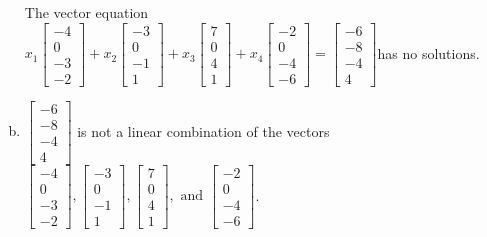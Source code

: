 \begin{exerciseAnswer}
\begin{enumerate}[(a)]
\begin{center}
\begin{minipage}{0.8\textwidth}
 The vector equation \( x_{1} \left[\begin{array}{c}
-4 \\
0 \\
-3 \\
-2
\end{array}\right] + x_{2} \left[\begin{array}{c}
-3 \\
0 \\
-1 \\
1
\end{array}\right] + x_{3} \left[\begin{array}{c}
7 \\
0 \\
4 \\
1
\end{array}\right] + x_{4} \left[\begin{array}{c}
-2 \\
0 \\
-4 \\
-6
\end{array}\right] = \left[\begin{array}{c}
-6 \\
-8 \\
-4 \\
4
\end{array}\right] \)has no solutions.
\end{minipage}\end{center}
    
\item 

\( \left[\begin{array}{c}
-6 \\
-8 \\
-4 \\
4
\end{array}\right] \) is not a linear combination of the vectors \( \left[\begin{array}{c}
-4 \\
0 \\
-3 \\
-2
\end{array}\right] , \left[\begin{array}{c}
-3 \\
0 \\
-1 \\
1
\end{array}\right] , \left[\begin{array}{c}
7 \\
0 \\
4 \\
1
\end{array}\right] , \text{ and } \left[\begin{array}{c}
-2 \\
0 \\
-4 \\
-6
\end{array}\right] \). 


\end{enumerate}
    
\end{exerciseAnswer}
    
